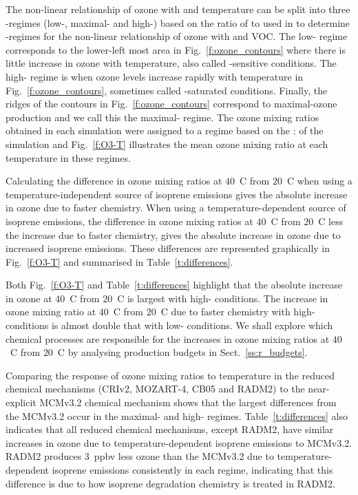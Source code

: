 The non-linear relationship of ozone with  and temperature can be split into three -regimes (low-, maximal- and high-) based on the ratio of  to  used in \citet{Sillman:1995} to determine -regimes for the non-linear relationship of ozone with  and VOC.
The low- regime corresponds to the lower-left most area in Fig.~\ref{f:ozone_contours} where there is little increase in ozone with temperature, also called -sensitive conditions.
The high- regime is when ozone levels increase rapidly with temperature in Fig.~\ref{f:ozone_contours}, sometimes called -saturated conditions.
Finally, the ridges of the contours in Fig.~\ref{f:ozone_contours} correspond to maximal-ozone production and we call this the maximal- regime.
The ozone mixing ratios obtained in each simulation were assigned to a  regime based on the : of the simulation and Fig.~\ref{f:O3-T} illustrates the mean ozone mixing ratio at each temperature in these  regimes.

Calculating the difference in ozone mixing ratios at $40$~\degree C from $20$~\degree C when using a temperature-independent source of isoprene emissions gives the absolute increase in ozone due to faster chemistry.
When using a temperature-dependent source of isoprene emissions, the difference in ozone mixing ratios at $40$~\degree C from $20$~\degree C less the increase due to faster chemistry, gives the absolute increase in ozone due to increased isoprene emissions.
These differences are represented graphically in Fig.~\ref{f:O3-T} and summarised in Table~\ref{t:differences}.

Both Fig.~\ref{f:O3-T} and Table~\ref{t:differences} highlight that the absolute increase in ozone at $40$~\degree C from $20$~\degree C is largest with high- conditions.
The increase in ozone mixing ratio at $40$~\degree C from $20$~\degree C due to faster chemistry with high- conditions is almost double that with low- conditions.
We shall explore which chemical processes are responsible for the increases in ozone mixing ratios at $40$~\degree C from $20$~\degree C by analysing  production budgets in Sect.~\ref{ss:r_budgets}.

Comparing the response of ozone mixing ratios to temperature in the reduced chemical mechanisms (CRIv2, MOZART-4, CB05 and RADM2) to the near-explicit MCMv3.2 chemical mechanism shows that the largest differences from the MCMv3.2 occur in the maximal- and high- regimes.
Table~\ref{t:differences} also indicates that all reduced chemical mechanisms, except RADM2, have similar increases in ozone due to temperature-dependent isoprene emissions to MCMv3.2.
RADM2 produces $3$~ppbv less ozone than the MCMv3.2 due to temperature-dependent isoprene emissions consistently in each  regime, indicating that this difference is due to how isoprene degradation chemistry is treated in RADM2.

